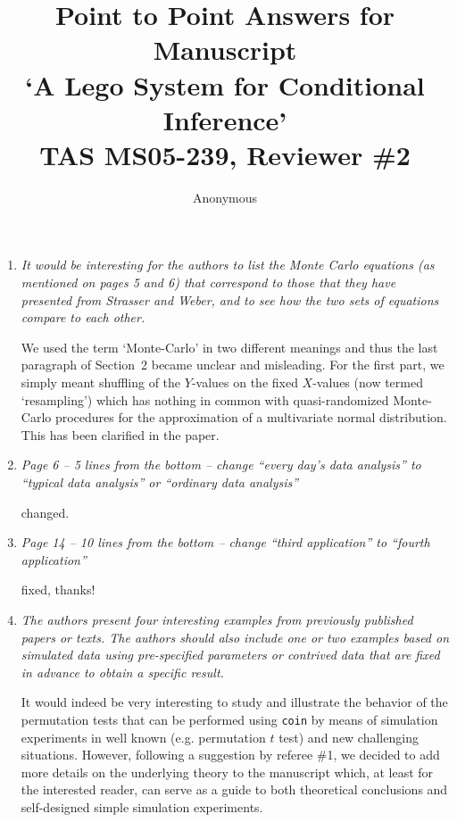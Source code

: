 \documentclass[11pt]{article}
\begin{document}
\title{Point to Point Answers for Manuscript \\
`A Lego System for Conditional Inference' \\
TAS MS05-239, Reviewer \#2}
\author{Anonymous}
\maketitle

\begin{enumerate}

\item \textsl{It would be interesting for the authors to list the Monte Carlo equations
              (as mentioned on pages 5 and 6) that correspond to those that they have 
              presented from Strasser and Weber, and to see how the two sets of equations 
              compare to each other.}

We used the term `Monte-Carlo' in two different meanings and thus the last
paragraph of Section~2 became unclear and misleading. For the first part, we
simply meant shuffling of the $Y$-values on the fixed $X$-values (now
termed `resampling') which has nothing in common with quasi-randomized
Monte-Carlo procedures for the approximation of a multivariate normal
distribution. This has been clarified in the paper.

\item \textsl{Page 6 – 5 lines from the bottom – change “every day’s data analysis” to
              “typical data analysis” or “ordinary data analysis”}

changed.

\item \textsl{Page 14 – 10 lines from the bottom – change “third application” to
              “fourth application”}

fixed, thanks!

\item \textsl{The authors present four interesting examples from previously published
              papers or texts. The authors should also include one or two examples 
              based on simulated data using pre-specified
              parameters or contrived data that are fixed in advance to obtain a specific
              result.}

It would indeed be very interesting to study and illustrate the behavior of the
permutation tests that can be performed using \texttt{coin} by means of
simulation experiments in well known (e.g. permutation $t$ test) and new
challenging situations. However, following a suggestion by referee \#1, we
decided to add more details on the underlying theory to the manuscript
which, at least for the interested reader, can serve as a guide to both
theoretical conclusions and self-designed simple simulation experiments. 


\end{enumerate}
\end{document}
